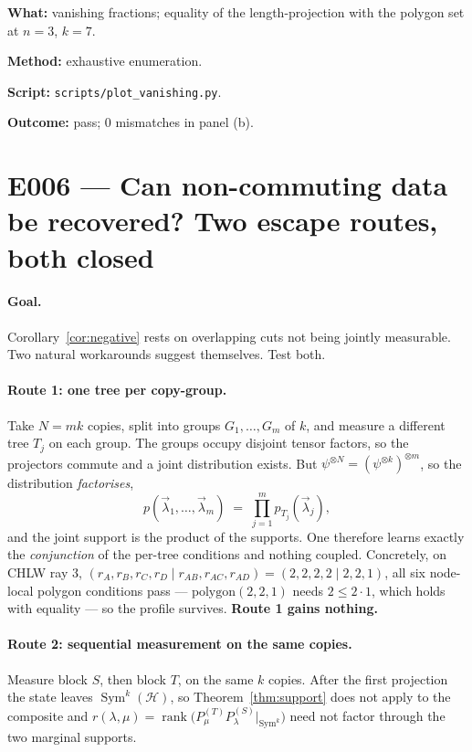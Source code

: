 \documentclass[11pt]{article}
\theoremstyle{definition}
\theoremstyle{remark}
\newcommand{\bmlam}{\vec{\lambda}}
\newcommand{\Sym}{\operatorname{Sym}}
\newcommand{\rank}{\operatorname{rank}}
\newcommand{\Hil}{\mathcal{H}}
\begin{document}
\begin{verification}
\textbf{What:} vanishing fractions; equality of the length-projection with the polygon
set at $n=3$, $k=7$.

\textbf{Method:} exhaustive enumeration.

\textbf{Script:} \texttt{scripts/plot\_vanishing.py}.

\textbf{Outcome:} pass; 0 mismatches in panel (b).
\end{verification}

\section{E006 --- Can non-commuting data be recovered? Two escape routes, both closed}
\label{sec:escapes}

\paragraph{Goal.}
Corollary~\ref{cor:negative} rests on overlapping cuts not being jointly measurable.
Two natural workarounds suggest themselves. Test both.

\paragraph{Route 1: one tree per copy-group.}
Take $N = mk$ copies, split into groups $G_1,\dots,G_m$ of $k$, and measure a different
tree $T_j$ on each group. The groups occupy disjoint tensor factors, so the projectors
commute and a joint distribution exists. But
$\psi^{\otimes N} = (\psi^{\otimes k})^{\otimes m}$, so the distribution
\emph{factorises},
\[
  p(\bmlam_1,\dots,\bmlam_m) \;=\; \prod_{j=1}^m p_{T_j}(\bmlam_j),
\]
and the joint support is the product of the supports. One therefore learns exactly the
\emph{conjunction} of the per-tree conditions and nothing coupled. Concretely, on
CHLW ray 3, $(r_A,r_B,r_C,r_D \mid r_{AB},r_{AC},r_{AD}) = (2,2,2,2 \mid 2,2,1)$, all six
node-local polygon conditions pass --- $\mathrm{polygon}(2,2,1)$ needs $2 \le 2\cdot 1$,
which holds with equality --- so the profile survives. \textbf{Route 1 gains nothing.}

\paragraph{Route 2: sequential measurement on the same copies.}
Measure block $S$, then block $T$, on the same $k$ copies. After the first projection the
state leaves $\Sym^k(\Hil)$, so Theorem~\ref{thm:support} does not apply to the
composite and
$r(\lambda,\mu) = \rank\bigl(P^{(T)}_\mu P^{(S)}_\lambda|_{\Sym^k}\bigr)$
need not factor through the two marginal supports.
\end{document}
